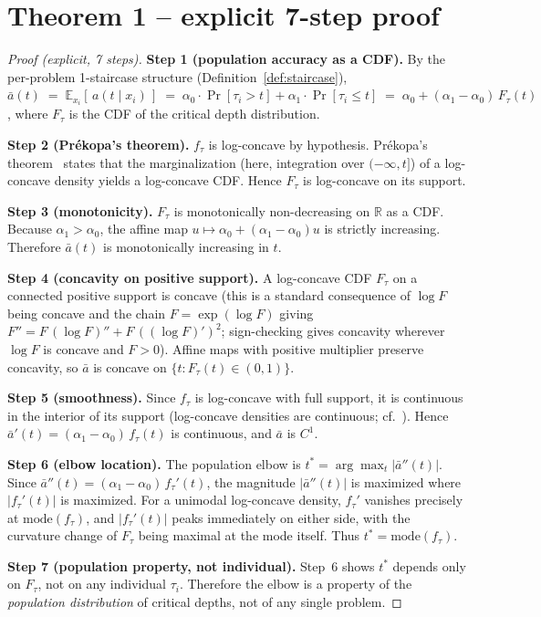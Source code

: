 \documentclass{article}
\newcommand{\E}{\mathbb{E}}
\begin{document}
\section{Theorem 1 -- explicit 7-step proof}
\label{app:proof}
\begin{proof}[Proof (explicit, 7 steps)]
\textbf{Step 1 (population accuracy as a CDF).}  By the per-problem 1-staircase structure (Definition~\ref{def:staircase}),
$\bar{a}(t) \;=\; \E_{x_i}[\,a(t \mid x_i)\,]
   \;=\; \alpha_0 \cdot \Pr[\tau_i > t] + \alpha_1 \cdot \Pr[\tau_i \le t]
   \;=\; \alpha_0 + (\alpha_1 - \alpha_0)\, F_\tau(t)$,
where $F_\tau$ is the CDF of the critical depth distribution.

\textbf{Step 2 (Pr\'{e}kopa's theorem).}  $f_\tau$ is log-concave by hypothesis.  Pr\'{e}kopa's theorem~\citep{prekopa1973logconcave} states that the marginalization (here, integration over $(-\infty, t]$) of a log-concave density yields a log-concave CDF.  Hence $F_\tau$ is log-concave on its support.

\textbf{Step 3 (monotonicity).}  $F_\tau$ is monotonically non-decreasing on $\mathbb{R}$ as a CDF.  Because $\alpha_1 > \alpha_0$, the affine map $u \mapsto \alpha_0 + (\alpha_1 - \alpha_0) u$ is strictly increasing.  Therefore $\bar{a}(t)$ is monotonically increasing in $t$.

\textbf{Step 4 (concavity on positive support).}  A log-concave CDF $F_\tau$ on a connected positive support is concave (this is a standard consequence of $\log F$ being concave and the chain $F = \exp(\log F)$ giving $F'' = F\,(\log F)'' + F\,((\log F)')^2$; sign-checking gives concavity wherever $\log F$ is concave and $F > 0$).  Affine maps with positive multiplier preserve concavity, so $\bar{a}$ is concave on $\{t : F_\tau(t) \in (0, 1)\}$.

\textbf{Step 5 (smoothness).}  Since $f_\tau$ is log-concave with full support, it is continuous in the interior of its support (log-concave densities are continuous; cf.\ \citealp{ibragimov1956log}).  Hence $\bar{a}'(t) = (\alpha_1 - \alpha_0)\, f_\tau(t)$ is continuous, and $\bar{a}$ is $C^1$.

\textbf{Step 6 (elbow location).}  The population elbow is $t^* = \arg\max_t |\bar{a}''(t)|$.  Since $\bar{a}''(t) = (\alpha_1 - \alpha_0)\, f_\tau'(t)$, the magnitude $|\bar{a}''(t)|$ is maximized where $|f_\tau'(t)|$ is maximized.  For a unimodal log-concave density, $f_\tau'$ vanishes precisely at $\mathrm{mode}(f_\tau)$, and $|f_\tau'(t)|$ peaks immediately on either side, with the curvature change of $F_\tau$ being maximal at the mode itself.  Thus $t^* = \mathrm{mode}(f_\tau)$.

\textbf{Step 7 (population property, not individual).}  Step~6 shows $t^*$ depends only on $F_\tau$, not on any individual $\tau_i$.  Therefore the elbow is a property of the \emph{population distribution} of critical depths, not of any single problem.
\end{proof}
\end{document}
